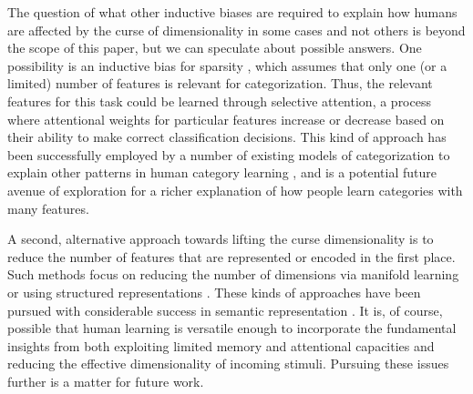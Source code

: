 \documentclass[a4paper, doc, floatsintext]{apa6}
\begin{document}

The question of what other inductive biases are required to explain how humans are affected by the curse of dimensionality in some cases and not others is beyond the scope of this paper, but we can speculate about possible answers. One possibility is an inductive bias for sparsity \cite{gershman2010learning}, which assumes that only one (or a limited) number of features is relevant for categorization. Thus, the relevant features for this task could be learned through selective attention, a process where attentional weights for particular features increase or decrease based on their ability to make correct classification decisions. This kind of approach has been successfully employed by a number of existing models of categorization to explain other patterns in human category learning \cite{nosofsky1986attention, kruschke1992alcove}, and is a potential future avenue of exploration for a richer explanation of how people learn categories with many features.


A second, alternative approach towards lifting the curse dimensionality is to reduce the number of features that are represented or encoded in the first place. Such methods focus on reducing the number of dimensions via manifold learning \cite{tenenbaum1998mapping} or using structured representations \cite{kemp2009structured, tenenbaum2011grow, lake2015human}. These kinds of approaches have been pursued with considerable success in semantic representation \cite{griffiths2007topics,landauerdumais97}. It is, of course, possible that human learning is versatile enough to incorporate the fundamental insights from both exploiting limited memory and attentional capacities and reducing the effective dimensionality of incoming stimuli. Pursuing these issues further is a matter for future work.
\end{document}
